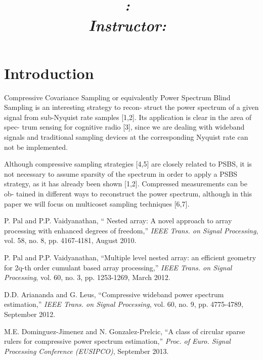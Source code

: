 \documentclass[letterpaper,10pt]{article}
\title{
    \vspace{2in}
    \textmd{\textbf{\projectname}}\\
    \normalsize\vspace{0.3in}\large{\textit{\hmwkClass:\ \hmwkTitle}}\\
    \vspace{0.1in}\large{\textit{Instructor:\ \hmwkClassInstructor}}
    \vspace{3in}
}
\author{\textbf{\hmwkAuthorName}}
\date{}
\begin{document}
\maketitle

\pagebreak

\section{Introduction}
Compressive Covariance Sampling or equivalently Power Spectrum Blind Sampling is an interesting strategy to recon- struct the power spectrum of a given signal from sub-Nyquist rate samples [1,2]. Its application is clear in the area of spec- trum sensing for cognitive radio [3], since we are dealing with wideband signals and traditional sampling devices at the corresponding Nyquist rate can not be implemented.

Although compressive sampling strategies [4,5] are closely related to PSBS, it is not necessary to assume sparsity of the spectrum in order to apply a PSBS strategy, as it has already been shown [1,2]. Compressed measurements can be ob- tained in different ways to reconstruct the power spectrum, although in this paper we will focus on multicoset sampling techniques [6,7].

\pagebreak

\begin{thebibliography}{1}
    \setlength{\parskip}{2pt} %
   P. Pal and P.P. Vaidyanathan, `` Nested array: A novel approach to array processing with enhanced degrees of freedom,'' \emph{IEEE Trans. on Signal Processing}, vol. 58, no. 8, pp. 4167-4181, August 2010.

   P. Pal and P.P. Vaidyanathan, ``Multiple level nested array: an efficient geometry for 2q-th order cumulant based array processing,'' \emph{IEEE Trans. on Signal Processing}, vol. 60, no. 3, pp. 1253-1269, March 2012.

   D.D. Ariananda and G. Leus, ``Compressive wideband power spectrum estimation,'' \emph{IEEE Trans. on Signal Processing}, vol. 60, no. 9, pp. 4775-4789, September 2012.

   M.E. Dominguez-Jimenez and N. Gonzalez-Prelcic, ``A class of circular sparse rulers for compressive power spectrum estimation,'' \emph{Proc. of Euro. Signal Processing Conference (EUSIPCO)}, September 2013.

\end{thebibliography}
\end{document}
